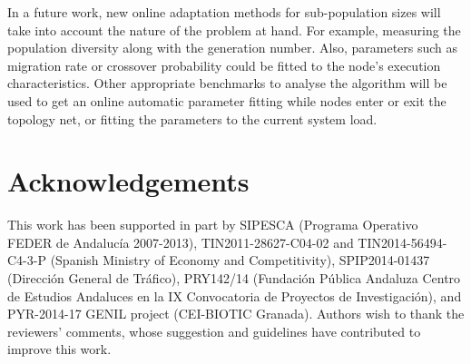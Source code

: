 \documentclass[final,1p,times]{elsarticle}
\begin{document}
In a future work, new online adaptation methods for sub-population sizes will take into account the nature of the problem at hand. For example, measuring the population diversity along with the generation number. Also, parameters such as migration rate or crossover probability could be fitted to the node's execution characteristics. Other appropriate benchmarks to analyse the algorithm will be used to get an online automatic parameter fitting while nodes enter or exit the topology net, or fitting the parameters to the current system load.

\section*{Acknowledgements}
This work has been supported in part by SIPESCA (Programa Operativo FEDER de Andalucía 2007-2013), TIN2011-28627-C04-02 and TIN2014-56494-C4-3-P (Spanish Ministry of Economy and Competitivity), SPIP2014-01437 (Direcci{\'o}n General de Tr{\'a}fico), PRY142/14 (Fundaci{\'o}n P{\'u}blica Andaluza Centro de Estudios Andaluces en la IX Convocatoria de Proyectos de Investigaci{\'o}n), and PYR-2014-17 GENIL project (CEI-BIOTIC Granada). Authors wish to thank the reviewers' comments, whose suggestion and guidelines have contributed to improve this work.







%
%



\end{document}
